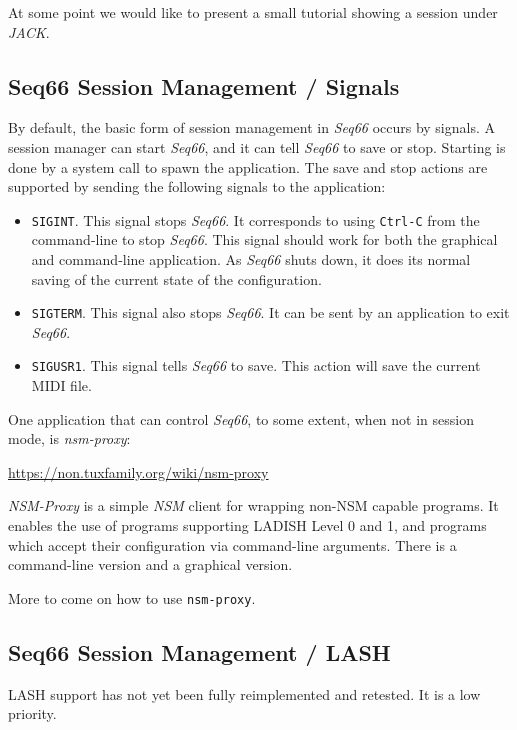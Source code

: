    At some point we would like to present a small tutorial showing a session
   under \textsl{JACK}.

\subsection{Seq66 Session Management / Signals}
\label{subsec:sessions_signals}

   By default, the basic form of session management in
   \textsl{Seq66} occurs by signals.  A
   session manager can start \textsl{Seq66}, and it can tell \textsl{Seq66} to
   save or stop.  Starting is done by a system call to spawn the application.
   The save and stop actions are supported by sending the following signals to
   the application:

   \begin{itemize}
      \item \texttt{SIGINT}.
         This signal stops \textsl{Seq66}. It corresponds
         to using \texttt{Ctrl-C} from the command-line to stop \textsl{Seq66}.
         This signal should work for both the graphical and command-line
         application.  As \textsl{Seq66} shuts down, it does its normal saving
         of the current state of the configuration.
      \item \texttt{SIGTERM}.
         This signal also stops \textsl{Seq66}.  It can
         be sent by an application to exit \textsl{Seq66}.
      \item \texttt{SIGUSR1}.
         This signal tells \textsl{Seq66} to save.  This
         action will save the current MIDI file.
   \end{itemize}

   One application that can control \textsl{Seq66}, to some extent, when not in
   session mode, is \textsl{nsm-proxy}:

      \url{https://non.tuxfamily.org/wiki/nsm-proxy}

   \textsl{NSM-Proxy} is a simple \textsl{NSM} client for wrapping non-NSM
   capable programs. It enables the use of programs supporting LADISH Level 0
   and 1, and programs which accept their configuration via command-line
   arguments.  There is a command-line version and a graphical version.

   More to come on how to use \texttt{nsm-proxy}.

\subsection{Seq66 Session Management / LASH}
\label{subsec:sessions_lash}

   LASH support has not yet been fully reimplemented and retested.
   It is a low priority.

